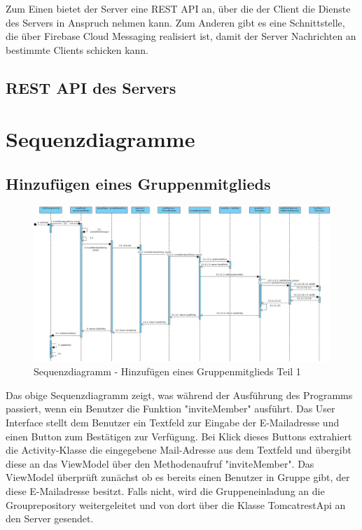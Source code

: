 \documentclass[parskip=full]{scrartcl}
\begin{document}
Zum Einen bietet der Server eine REST API an, über die der Client die Dienste des Servers in Anspruch nehmen kann. Zum Anderen gibt es eine Schnittstelle, die über Firebase Cloud Messaging realisiert ist, damit der Server Nachrichten an bestimmte Clients schicken kann.

\subsection{REST API des Servers}

\section{Sequenzdiagramme}

\subsection{Hinzufügen eines Gruppenmitglieds}

\begin{figure}[H]
	\centering
	\includegraphics[width=1\textwidth]{../Sequenzdiagramme/addGroupMember.jpg}
	\caption{Sequenzdiagramm - Hinzufügen eines Gruppenmitglieds Teil 1}
\end{figure}

Das obige Sequenzdiagramm zeigt, was während der Ausführung des Programms passiert, wenn ein Benutzer die Funktion "inviteMember" ausführt. Das User Interface stellt dem Benutzer ein Textfeld zur Eingabe der E-Mailadresse und einen Button zum Bestätigen zur Verfügung. Bei Klick dieses Buttons extrahiert die Activity-Klasse die eingegebene Mail-Adresse aus dem Textfeld und übergibt diese an das ViewModel über den Methodenaufruf "inviteMember". Das ViewModel überprüft zunächst ob es bereits einen Benutzer in Gruppe gibt, der diese E-Mailadresse besitzt. Falls nicht, wird die Gruppeneinladung an die Grouprepository weitergeleitet und von dort über die Klasse TomcatrestApi an den Server gesendet.
\end{document}

